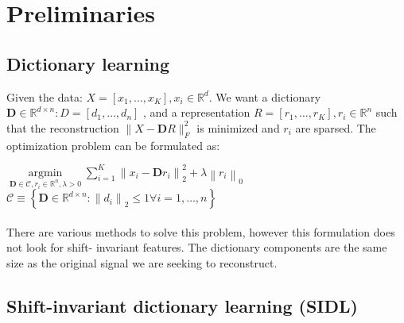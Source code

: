 \documentclass[11pt,a4paper]{article}
\begin{document}
 



\section{Preliminaries}


\subsection{ Dictionary learning  }
Given the data: $ X=\left[x_{1}, \ldots, x_{K}\right], x_{i} \in \mathbb{R}^{d} $. 
We want a dictionary $\mathbf{D} \in \mathbb{R}^{d \times n}: D=\left[d_{1}, \ldots, d_{n}\right]$ ,
and a representation $R=\left[r_{1}, \ldots, r_{K}\right], r_{i} \in \mathbb{R}^{n}$ such that the reconstruction $\|X-\mathbf{D} R\|_{F}^{2}$ is minimized and $r_{i}$ are sparsed. The optimization problem can be formulated as: 

$\underset{\mathbf{D} \in \mathcal{C}, r_{i} \in \mathbb{R}^{n}, \lambda>0} {\operatorname{argmin}} \sum_{i=1}^{K}\left\|x_{i}-\mathbf{D} r_{i}\right\|_{2}^{2}+\lambda\left\|r_{i}\right\|_{0}$ \\   $\mathcal{C} \equiv\left\{\mathbf{D} \in \mathbb{R}^{d \times n}:\left\|d_{i}\right\|_{2} \leq 1 \forall i=1, \ldots, n\right\} $
\\ \\
There are various methods to solve this problem, however this formulation does not look for shift- invariant features. The dictionary components are the same size as the original signal we are seeking to reconstruct.

\subsection{ Shift-invariant dictionary learning (SIDL)  }
\end{document}
